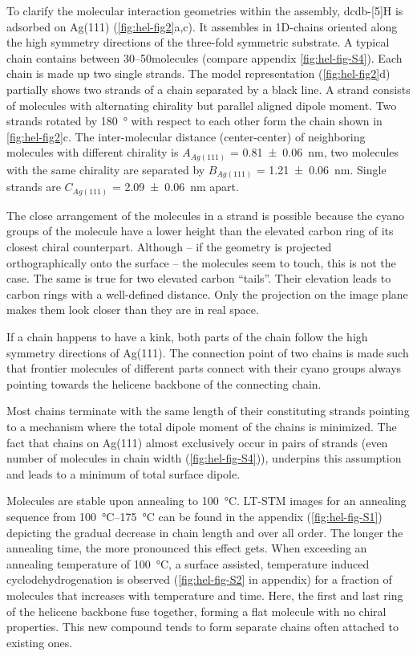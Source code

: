 To clarify the molecular interaction geometries within the assembly, dcdb-[5]H is adsorbed on Ag(111) (\autoref{fig:hel-fig2}a,c).  It assembles in 1D-chains oriented along the high symmetry directions of the three-fold symmetric substrate. A typical chain contains between \SIrange{30}{50}{}molecules (compare appendix \autoref{fig:hel-fig-S4}). Each chain is made up two single strands. The model representation (\autoref{fig:hel-fig2}d) partially shows two strands of a chain separated by a black line. A strand consists of molecules with alternating chirality but parallel aligned dipole moment. Two strands rotated by \SI{180}{\degree} with respect to each other form the chain shown in \autoref{fig:hel-fig2}c. The inter-molecular distance (center-center) of neighboring molecules with different chirality is $A_{Ag(111)}$ = \SI{0.81 \pm 0.06}{\nano \meter}, two molecules with the same chirality are separated by $B_{Ag(111)}$ = \SI{1.21 \pm 0.06}{\nano \meter}. Single strands are $C_{Ag(111)}$ = \SI{2.09 \pm 0.06}{\nano \meter} apart. 

The close arrangement of the molecules in a strand is possible because the cyano groups of the molecule have a lower height than the elevated carbon ring of its closest chiral counterpart. Although – if the geometry is projected orthographically onto the surface – the molecules seem to touch, this is not the case. The same is true for two elevated carbon “tails”. Their elevation leads to carbon rings with a well-defined distance. Only the projection on the image plane makes them look closer than they are in real space. 

If a chain happens to have a kink, both parts of the chain follow the high symmetry directions of Ag(111). The connection point of two chains is made such that frontier molecules of different parts connect with their cyano groups always pointing towards the helicene backbone of the connecting chain. 

Most chains terminate with the same length of their constituting strands pointing to a mechanism where the total dipole moment of the chains is minimized. The fact that chains on Ag(111) almost exclusively occur in pairs of strands (even number of molecules in chain width (\autoref{fig:hel-fig-S4})), underpins this assumption and leads to a minimum of total surface dipole. 

Molecules are stable upon annealing to \SI{100}{\celsius}. LT-STM images for an annealing sequence from \SIrange{100}{175}{\celsius} can be found in the appendix (\autoref{fig:hel-fig-S1}) depicting the gradual decrease in chain length and over all order. The longer the annealing time, the more pronounced this effect gets. When exceeding an annealing temperature of \SI{100}{\celsius}, a surface assisted, temperature induced cyclodehydrogenation is observed (\autoref{fig:hel-fig-S2} in appendix) for a fraction of molecules that increases with temperature and time. Here, the first and last ring of the helicene backbone fuse together, forming a flat molecule with no chiral properties. This new compound tends to form separate chains often attached to existing ones. 

